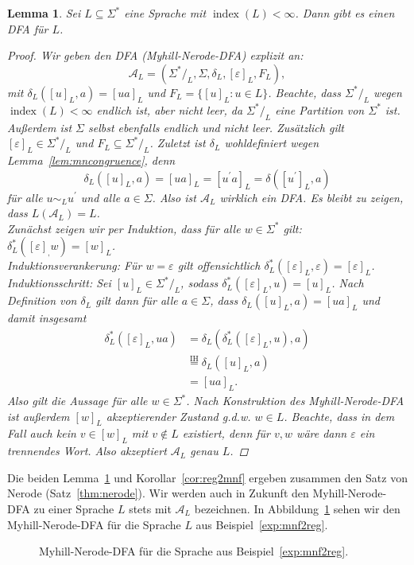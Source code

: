 \documentclass[11pt, a4paper]{article}
\theoremstyle{definition}
\theoremstyle{plain}
\newtheorem{lemma}[definition]{Lemma}
\numberwithin{equation}{section}
\DeclareMathOperator{\ind}{index}
\begin{document}
\begin{lemma}\label{lem:mnf2reg}
	Sei $L \subseteq \Sigma^\ast$ eine Sprache mit $\ind(L) < \infty$. Dann gibt es einen DFA für $L$.
	\begin{proof}
		Wir geben den DFA (\textit{Myhill-Nerode-DFA}) explizit an:
		$$
			\mathcal{A}_L = (\Sigma^\ast/_L, \Sigma, \delta_L, [\varepsilon]_L, F_L),
		$$
		mit $\delta_L([u]_L, a) = [ua]_L$ und $F_L = \{[u]_L : u \in L\}$. Beachte, dass $\Sigma^\ast/_L$ wegen $\ind(L) < \infty$ endlich ist, aber nicht leer, da $\Sigma^\ast/_L$ eine Partition von $\Sigma^\ast$ ist. Außerdem ist $\Sigma$ selbst ebenfalls endlich und nicht leer. Zusätzlich gilt $[\varepsilon]_L \in \Sigma^\ast/_L$ und $F_L \subseteq \Sigma^\ast/_L$. Zuletzt ist $\delta_L$ wohldefiniert wegen Lemma~\ref{lem:mncongruence}, denn 
		$$
			\delta_L([u]_L, a) = [ua]_L = [u^\prime a]_L = \delta([u^\prime]_L, a)
		$$
		für alle $u \sim_L u^\prime$ und alle $a \in \Sigma$. Also ist $\mathcal{A}_L$ wirklich ein DFA. Es bleibt zu zeigen, dass $L(\mathcal{A}_L) = L$.\\
		Zunächst zeigen wir per Induktion, dass für alle $w \in \Sigma^\ast$ gilt: $\delta_L^\ast([\varepsilon]_, w) = [w]_L$.\\
		Induktionsverankerung: Für $w = \varepsilon$ gilt offensichtlich $\delta_L^\ast([\varepsilon]_L, \varepsilon) = [\varepsilon]_L$. \checkmark\\
		Induktionsschritt: Sei $[u]_L \in \Sigma^\ast/_L$, sodass $\delta_L^\ast([\varepsilon]_L, u) = [u]_L$. Nach Definition von $\delta_L$ gilt dann für alle $a \in \Sigma$, dass $\delta_L([u]_L, a) = [ua]_L$ und damit insgesamt
		\begin{align*}
			\delta_L^\ast([\varepsilon]_L, ua) &= \delta_L(\delta_L^\ast([\varepsilon]_L, u), a)\\
			&\overset{\text{IH}}{=} \delta_L([u]_L, a)\\
			&= [ua]_L.
		\end{align*}
		Also gilt die Aussage für alle $w \in \Sigma^\ast$. Nach Konstruktion des Myhill-Nerode-DFA ist außerdem $[w]_L$ akzeptierender Zustand g.d.w. $w \in L$. Beachte, dass in dem Fall auch kein $v \in [w]_L$ mit $v \notin L$ existiert, denn für $v, w$ wäre dann $\varepsilon$ ein trennendes Wort. Also akzeptiert $\mathcal{A}_L$ genau $L$.
	\end{proof}
\end{lemma}
Die beiden Lemma~\ref{lem:mnf2reg} und Korollar~\ref{cor:reg2mnf} ergeben zusammen den Satz von Nerode (Satz~\ref{thm:nerode}). Wir werden auch in Zukunft den Myhill-Nerode-DFA zu einer Sprache $L$ stets mit $\mathcal{A}_L$ bezeichnen. In Abbildung~\ref{fig:mndfa} sehen wir den Myhill-Nerode-DFA für die Sprache $L$ aus Beispiel~\ref{exp:mnf2reg}.
\begin{figure}
	\centering
	
	\caption{Myhill-Nerode-DFA für die Sprache aus Beispiel~\ref{exp:mnf2reg}.}
	\label{fig:mndfa}
\end{figure}
\end{document}
